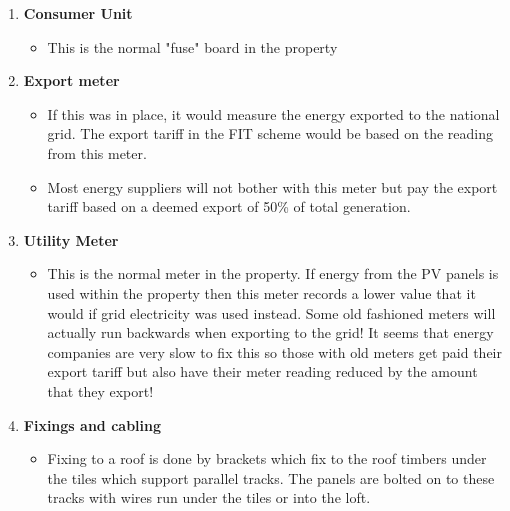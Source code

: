 \documentclass{article}
\begin{document}
\begin{enumerate}
\begin{itemize}
\end{itemize}
\item \textbf{Consumer Unit}
\begin{itemize}
\item This is the normal "fuse" board in the property
\end{itemize}
\item \textbf{Export meter}
\begin{itemize}
\item If this was in place, it would measure the energy exported to the national grid. The export tariff in the FIT scheme would be based on the reading from this meter.
\item Most energy suppliers will not bother with this meter but pay the export tariff based on a deemed export of 50\% of total generation. 
\end{itemize}
\item \textbf{Utility Meter}
\begin{itemize}
\item This is the normal meter in the property. If energy from the PV panels is used within the property then this meter records a lower value that it would if grid electricity was used instead. Some old fashioned meters will actually run backwards when exporting to the grid! It seems that energy companies are very slow to fix this so those with old meters get paid their export tariff but also have their meter reading reduced by the amount that they export!
\end{itemize}
\item \textbf{Fixings and cabling}
\begin{itemize}
\item Fixing to a roof is done by brackets which fix to the roof timbers under the tiles which support parallel tracks. The panels are bolted on to these tracks with wires run under the tiles or into the loft. 
\end{itemize}
\end{enumerate}
\end{document}

